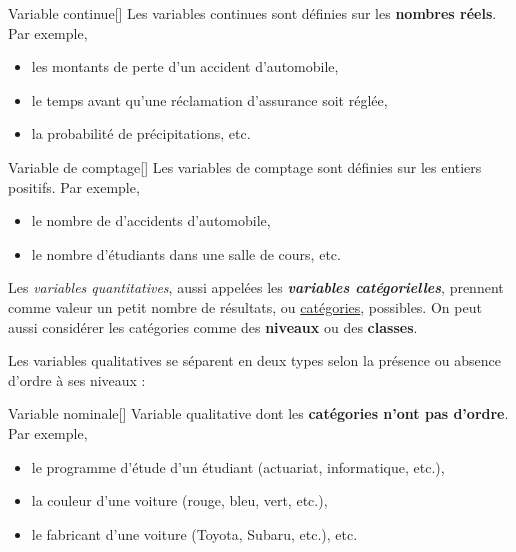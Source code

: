\documentclass[french]{article}
\begin{document}
\begin{multicols*}{2}
\begin{definitionNOHFILLsub}
\begin{definitionGENERAL}{Variable continue}[]
Les variables continues sont définies sur les \textbf{nombres réels}. Par exemple, 
\begin{itemize}
	\item	les montants de perte d'un accident d'automobile, 
	\item	le temps avant qu'une réclamation d'assurance soit réglée, 
	\item	la probabilité de précipitations, etc.
\end{itemize}
\end{definitionGENERAL}

\begin{definitionGENERAL}{Variable de comptage}[]
Les variables de comptage sont définies sur les entiers positifs. Par exemple,
\begin{itemize}
	\item	le nombre de d'accidents d'automobile, 
	\item	le nombre d'étudiants dans une salle de cours, etc.
\end{itemize}
\end{definitionGENERAL}

\end{definitionNOHFILLsub}

\begin{definitionNOHFILLsub}
Les \textit{variables quantitatives}, aussi appelées les \textbf{\textit{variables catégorielles}}, prennent comme valeur un petit nombre de résultats, ou \underline{catégories}, possibles. On peut aussi considérer les catégories comme des \textbf{niveaux} ou des \textbf{classes}.

\bigskip

Les variables qualitatives se séparent en deux types selon la présence ou absence d'ordre à ses niveaux : 

\begin{definitionGENERAL}{Variable nominale}[]
Variable qualitative dont les \textbf{catégories n'ont pas d'ordre}. Par exemple, 
\begin{itemize}
	\item	le programme d'étude d'un étudiant (actuariat, informatique, etc.), 
	\item	la couleur d'une voiture (rouge, bleu, vert, etc.), 
	\item	le fabricant d'une voiture (Toyota, Subaru, etc.), etc.
\end{itemize}
\end{definitionGENERAL}


\end{definitionNOHFILLsub}
\end{multicols*}
\end{document}
